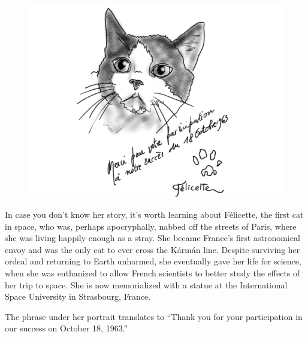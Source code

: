 \strut \vspace{20pt}

\begin{figure}
    \centering
    \includegraphics[width=1\linewidth]{img/felicette.png}
    \label{fig:felicette}
\end{figure}


In case you don't know her story, it's worth learning about F\'{e}licette, the first cat in space, who was, perhaps apocryphally, nabbed off the streets of Paris, where she was living happily enough as a stray. She became France's first astronomical envoy and was the only cat to ever cross the K\'{a}rm\'{a}n line. Despite surviving her ordeal and returning to Earth unharmed, she eventually gave her life for science, when she was euthanized to allow French scientists to better study the effects of her trip to space. She is now memorialized with a statue at the International Space University in Strasbourg, France.

The phrase under her portrait translates to ``Thank you for your participation in our success on October 18, 1963.''